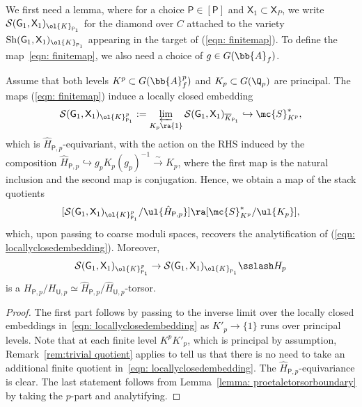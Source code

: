 \documentclass[letterpaper,11pt]{amsart}
\begin{document}
We first need a lemma, where for a choice $\mathsf{P} \in [\mathsf{P}]$ and $\mathsf{X}_1\subset \mathsf{X}_P$, we write $\mathcal{S}(\mathsf{G}_{1},\mathsf{X}_{1})_{\ol{K}_{\mathsf{P}_1}}$ for the diamond over $C$ attached to the variety $\mathrm{Sh}(\mathsf{G}_{1},\mathsf{X}_{1})_{\ol{K}_{\mathsf{P}_1}}$ appearing in the target of (\ref{eqn: finitemap}). To define the map~\eqref{eqn: finitemap}, we also need a choice of $g\in G(\bb{A}_f)$. 

\begin{lemma}\label{lemma: BoundaryInfinitePLevel} Assume that both levels $K^p\subset G(\bb{A}_f^p)$ and $K_p\subset G(\Q_p)$ are principal. 
The maps (\ref{eqn: finitemap}) induce a locally closed embedding
\[\mathcal{S}(\mathsf{G}_{1},\mathsf{X}_{1})_{\ol{K}^{p}_{\mathsf{P}_1}}:= \varprojlim_{K_{p} \ra \{1\}} \mathcal{S}(\mathsf{G}_{1},\mathsf{X}_1)_{\overline{K}_{\mathsf{P}_1}}\hookrightarrow \mc{S}_{K^p}^\ast,\]  
which is $\hat{H}_{\mathsf{P},p}$-equivariant, with the action on the RHS induced by the composition $\hat{H}_{\mathsf{P},p}\hookrightarrow g_pK_p(g_p)^{-1}\stackrel{\sim}{\to} K_p$, where the first map is the natural inclusion and the second map is conjugation. Hence, we obtain a map of the stack quotients
\[ [\mathcal{S}(\mathsf{G}_{1},\mathsf{X}_{1})_{\ol{K}^{p}_{\mathsf{P}_1}}/\ul{\hat{H}_{\mathsf{P},p}}] \ra [\mc{S}_{K^p}^\ast/\ul{K_{p}}],\]
which, upon passing to coarse moduli spaces, recovers the analytification of (\ref{eqn: locallyclosedembedding}). Moreover, 
\[\mathcal{S}(\mathsf{G}_{1},\mathsf{X}_{1})_{\ol{K}^{p}_{\mathsf{P}_1}}\to \mathcal{S}(\mathsf{G}_{1},\mathsf{X}_{1})_{\ol{K}_{\mathsf{P}_1}}\sslash H_p\] 
is a $H_{\mathsf{P},p}/H_{\mathsf{U},p}\simeq \hat{H}_{\mathsf{P},p}/\hat{H}_{\mathsf{U},p}$-torsor.
\end{lemma}
\begin{proof}
The first part follows by passing to the inverse limit over the locally closed embeddings in~\eqref{eqn: locallyclosedembedding} as $K'_p\to \{1\}$ runs over principal levels. Note that at each finite level $K^pK'_p$, which is principal by assumption, Remark~\ref{rem:trivial quotient} applies to tell us that there is no need to take an additional finite quotient in~\eqref{eqn: locallyclosedembedding}. 
    The $\hat{H}_{\mathsf{P},p}$-equivariance is clear. The last statement follows from Lemma~\ref{lemma: proetaletorsorboundary} by taking the $p$-part and analytifying.
\end{proof}
\end{document}
